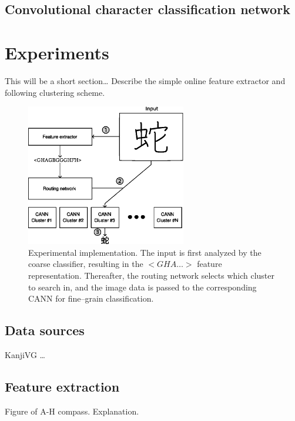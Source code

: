 \documentclass[10pt,conference,a4paper]{IEEEtran}
\begin{document}
	\subsection{Convolutional character classification network}


	\section{Experiments}
	\label{sec:experiments}

	This will be a short section\ldots
	Describe the simple online feature extractor and following clustering scheme.

	\begin{figure}
		\centering
		\includegraphics[width=2.75in]{./fig/experimental-implementation.eps}
		\caption{Experimental implementation. The input is first analyzed by the coarse classifier, resulting in the $<GHA\ldots>$ feature representation.
		Thereafter, the routing network selects which cluster to search in, and the image data is passed to the corresponding CANN for fine--grain classification.}
		\label{fig_experimental_implementation}
	\end{figure}



	\subsection{Data sources}

	KanjiVG \ldots


	\subsection{Feature extraction}

	Figure of A-H compass. Explanation.
\end{document}
